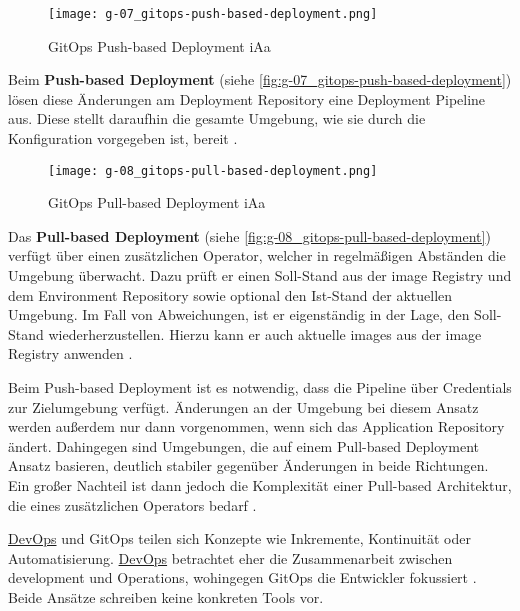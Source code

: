 \begin{figure}[h]
    \centering
    \texttt{[image: g-07\_gitops-push-based-deployment.png]}
    \caption{GitOps Push-based Deployment \acrshort{iAa} \citeauthor{109:GitOps}}
    \label{fig:g-07_gitops-push-based-deployment}
\end{figure}

Beim \textbf{Push-based Deployment} (siehe \autoref{fig:g-07_gitops-push-based-deployment}) lösen diese Änderungen am Deployment Repository eine Deployment Pipeline aus. Diese stellt daraufhin die gesamte Umgebung, wie sie durch die Konfiguration vorgegeben ist, bereit \cite{109:GitOps}.

\begin{figure}[h]
    \centering
    \texttt{[image: g-08\_gitops-pull-based-deployment.png]}
    \caption{GitOps Pull-based Deployment \acrshort{iAa} \citeauthor{109:GitOps}}
    \label{fig:g-08_gitops-pull-based-deployment}
\end{figure}

Das \textbf{Pull-based Deployment} (siehe \autoref{fig:g-08_gitops-pull-based-deployment}) verfügt über einen zusätzlichen Operator, welcher in regelmäßigen Abständen die Umgebung überwacht. Dazu prüft er einen Soll-Stand aus der \Gls{image} Registry und dem Environment Repository sowie optional den Ist-Stand der aktuellen Umgebung. Im Fall von Abweichungen, ist er eigenständig in der Lage, den Soll-Stand wiederherzustellen. Hierzu kann er auch aktuelle \Glspl{image} aus der \Gls{image} Registry anwenden \cite{109:GitOps}.

Beim Push-based Deployment ist es notwendig, dass die Pipeline über Credentials zur Zielumgebung verfügt. Änderungen an der Umgebung bei diesem Ansatz werden außerdem nur dann vorgenommen, wenn sich das Application Repository ändert. Dahingegen sind Umgebungen, die auf einem Pull-based Deployment Ansatz basieren, deutlich stabiler gegenüber Änderungen in beide Richtungen. Ein großer Nachteil ist dann jedoch die Komplexität einer Pull-based Architektur, die eines zusätzlichen Operators bedarf \cite{109:GitOps}.

\hyperref[sec:03-01_devops]{DevOps} und GitOps teilen sich Konzepte wie Inkremente, Kontinuität oder Automatisierung. \hyperref[sec:03-01_devops]{DevOps} betrachtet eher die Zusammenarbeit zwischen \Gls{development} und Operations, wohingegen GitOps die Entwickler fokussiert \cite{009:GitOps-Evolution-of-DevOps}. Beide Ansätze schreiben keine konkreten Tools vor.
